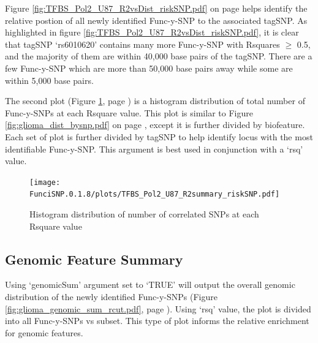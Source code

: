 \documentclass[12pt,fullpage]{article}
\begin{document}
Figure \ref{fig:TFBS_Pol2_U87_R2vsDist_riskSNP.pdf} on page
\pageref{fig:TFBS_Pol2_U87_R2vsDist_riskSNP.pdf} helps identify the relative
postion of all newly identified Func-y-SNP to the associated tagSNP. As
highlighted in figure \ref{fig:TFBS_Pol2_U87_R2vsDist_riskSNP.pdf}, it is clear
that tagSNP `rs6010620' contains many more Func-y-SNP with Rsquares $\ge$ 0.5,
     and the majority of them are within 40,000 base pairs of the tagSNP. There
     are a few Func-y-SNP which are more than 50,000 base pairs away while some
     are within 5,000 base pairs.

The second plot (Figure \ref{fig:TFBS_Pol2_U87_R2summary_riskSNP.pdf}, page
        \pageref{fig:TFBS_Pol2_U87_R2summary_riskSNP.pdf}) is a histogram
distribution of total number of Func-y-SNPs at each Rsquare value. This plot is
similar to Figure \ref{fig:glioma_dist_bysnp.pdf} on page
\pageref{fig:glioma_dist_bysnp.pdf}, except it is further divided by biofeature.
Each set of plot is further divided by tagSNP to help identify locus with the
most identifiable Func-y-SNP. This argument is best used in conjunction with a
`rsq' value.

\begin{figure}[ht!]
\begin{center}
\texttt{[image: FunciSNP.0.1.8/plots/TFBS\_Pol2\_U87\_R2summary\_riskSNP.pdf]}
\caption{\label{fig:TFBS_Pol2_U87_R2summary_riskSNP.pdf} Histogram 
distribution of number of correlated SNPs at each Rsquare value}
{\footnotesize{}}
\end{center}
\end{figure}

\subsection{Genomic Feature Summary}                                             
                                                                                 
Using `genomicSum' argument set to `TRUE' will output the overall genomic        
distribution of the newly identified Func-y-SNPs (Figure                         
        \ref{fig:glioma_genomic_sum_rcut.pdf}, page                                      
        \pageref{fig:glioma_genomic_sum_rcut.pdf}).  Using `rsq' value, the plot
is         
divided into all Func-y-SNPs vs subset. This type of plot informs the relative   
enrichment for genomic features.                                                 
                                                                                 
\end{document}
